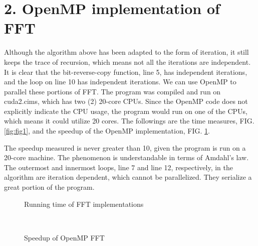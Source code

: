 \documentclass[amsmath,amssymb]{revtex4}
\begin{document}
\section{\label{sec:sec2}2. OpenMP implementation of FFT}
Although the algorithm above has been adapted to the form of iteration, it still keeps the trace of recursion, which means not all the iterations are independent. It is clear that the bit-reverse-copy function, line 5, has independent iterations, and the loop on line 10 has independent iterations. We can use OpenMP to parallel these portions of FFT. The program was compiled and run on cuda2.cims, which has two (2) 20-core CPUs. Since the OpenMP code does not explicitly indicate the CPU usage, the program would run on one of the CPUs, which means it could utilize 20 cores. The followings are the time measures, FIG. \ref{fig:fig1}, and the speedup of the OpenMP implementation, FIG. \ref{fig:fig2}.

The speedup measured is never greater than 10, given the program is run on a 20-core machine. The phenomenon is understandable in terms of Amdahl's law. The outermost and innermost loops, line 7 and line 12, respectively, in the algorithm are iteration dependent, which cannot be parallelized. They serialize a great portion of the program.

\begin{figure}[h]
  \centering
  \begin{minipage}[b]{0.45\textwidth}

\caption{\label{fig:fig1}Running time of FFT implementations}
\end{minipage}
~
\begin{minipage}[b]{0.45\textwidth}
\caption{\label{fig:fig2}Speedup of OpenMP FFT}
\end{minipage}
\end{figure}
\end{document}
